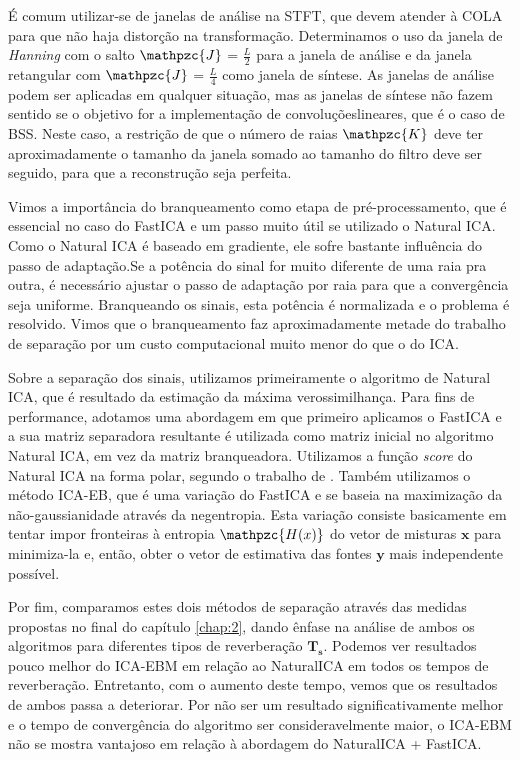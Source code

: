 É comum utilizar-se de janelas de análise na STFT, que devem atender à COLA para que não haja distorção na transformação. Determinamos o uso da janela de \textit{Hanning} com o salto $\mathpzc{J}$ = $\frac{L}{2}$ para a janela de análise e da janela retangular com  $\mathpzc{J}$ = $\frac{L}{4}$ como janela de síntese. As janelas de análise podem ser aplicadas em qualquer situação, mas as janelas de síntese não fazem sentido se o objetivo for a implementação de convoluçõeslineares, que é o caso de BSS. Neste caso, a restrição de que o número de raias $\mathpzc{K}$ deve ter aproximadamente o tamanho da janela somado ao tamanho do filtro deve ser seguido, para que a reconstrução seja perfeita. 

Vimos a importância do branqueamento como etapa de pré-processamento, que é essencial no caso do FastICA e um passo muito útil se utilizado o Natural ICA. Como o Natural ICA é baseado em gradiente, ele sofre bastante influência do passo de adaptação.Se a potência do sinal for muito diferente de uma raia pra outra, é necessário ajustar o passo de adaptação por raia para que a convergência seja uniforme. Branqueando os sinais, esta potência é normalizada e o problema é resolvido. Vimos que o branqueamento faz aproximadamente metade do trabalho de separação por um custo computacional muito menor do que o do ICA.
 
Sobre a separação dos sinais, utilizamos primeiramente o algoritmo de Natural ICA, que é resultado da estimação da máxima verossimilhança. Para fins de performance, adotamos uma abordagem em que primeiro aplicamos o FastICA e a sua matriz separadora resultante é utilizada como matriz inicial no algoritmo Natural ICA, em vez da matriz branqueadora. Utilizamos a função \textit{score} do Natural ICA na forma polar, segundo o trabalho de \cite{LuizVictorio}. Também utilizamos o método ICA-EB, que é uma variação do FastICA e se baseia na maximização da não-gaussianidade através da negentropia. Esta variação consiste basicamente em tentar impor fronteiras à entropia $\mathpzc{H(x)}$ do vetor de misturas $\mathbf{x}$ para minimiza-la e, então, obter o vetor de estimativa das fontes $\mathbf{y}$ mais independente possível.

Por fim, comparamos estes dois métodos de separação através das medidas propostas no final do capítulo \ref{chap:2}, dando ênfase na análise de ambos os algoritmos para diferentes tipos de reverberação $\mathbf{T_s}$. Podemos ver resultados pouco melhor do ICA-EBM em relação ao NaturalICA em todos os tempos de reverberação. Entretanto, com o aumento deste tempo, vemos que os resultados de ambos passa a deteriorar. Por não ser um resultado significativamente melhor e o tempo de convergência do algoritmo ser consideravelmente maior, o ICA-EBM não se mostra vantajoso em relação à abordagem do NaturalICA + FastICA.

